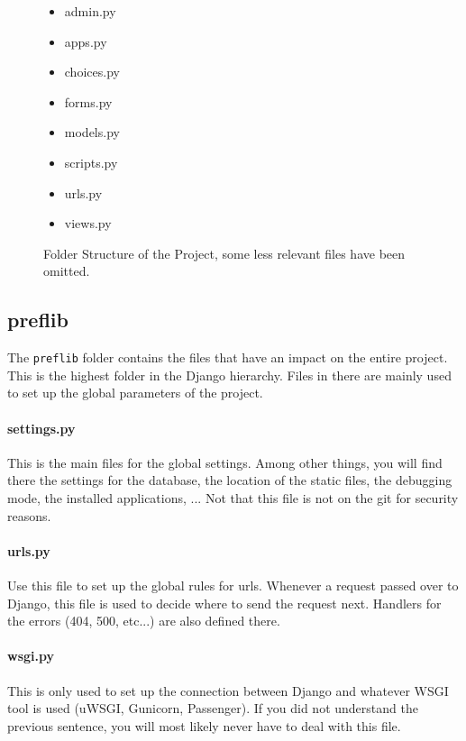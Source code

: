 \documentclass{report}
\begin{document}
\begin{figure}
\begin{multicols}{2}
\begin{itemize}
\begin{itemize}
\begin{itemize}
					\end{itemize}
					\item[\faFileO] admin.py
					\item[\faFileO] apps.py
					\item[\faFileO] choices.py
					\item[\faFileO] forms.py
					\item[\faFileO] models.py
					\item[\faFileO] scripts.py
					\item[\faFileO] urls.py
					\item[\faFileO] views.py
				\end{itemize}
			\end{itemize}
		\end{multicols}
		\caption{Folder Structure of the Project, some less relevant files have been omitted.}
		\label{fig:folderStruct}
	\end{figure}

	\subsection*{\faFolderO{}  preflib}
	
	The \texttt{preflib} folder contains the files that have an impact on the entire project. This is the highest folder in the Django hierarchy. Files in there are mainly used to set up the global parameters of the project.
	
	\paragraph*{\faFileO{} settings.py} This is the main files for the global settings. Among other things, you will find there the settings for the database, the location of the static files, the debugging mode, the installed applications, ... Not that this file is not on the git for security reasons.
	
	\paragraph*{\faFileO{} urls.py} Use this file to set up the global rules for urls. Whenever a request passed over to Django, this file is used to decide where to send the request next. Handlers for the errors (404, 500, etc...) are also defined there.
	
	\paragraph*{\faFileO{} wsgi.py} This is only used to set up the connection between Django and whatever WSGI tool is used (uWSGI, Gunicorn, Passenger). If you did not understand the previous sentence, you will most likely never have to deal with this file.
	
\end{document}
